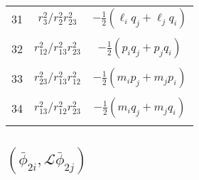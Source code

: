 \documentclass[Dissertation.tex]{subfiles}
\begin{document}
\begin{center}
\begin{longtable}{|c|c|c|}
31  & $r_3^2/r_2^2 r_{23}^2$  & $-\frac{1}{2} (\ell_i q_j + \ell_j q_i)$ \\
&  &  \\
32  & $r_{12}^2/r_{13}^2 r_{23}^2$  & $-\frac{1}{2} (p_i q_j + p_j q_i) $ \\
&  &  \\
33  & $r_{23}^2/r_{13}^2 r_{12}^2$  & $-\frac{1}{2} (m_i p_j + m_j p_i)$ \\
&  &  \\
34  & $r_{13}^2/r_{12}^2 r_{23}^2$  & $-\frac{1}{2} (m_i q_j + m_j q_i)$ \\
&  &  \\
\end{longtable}
\end{center}



\subsection{\texorpdfstring{${(\bar\phi_{2i}, \mathcal{L} \bar\phi_{2j})}$}{(phi2i, L phi2j)}}
\end{document}
